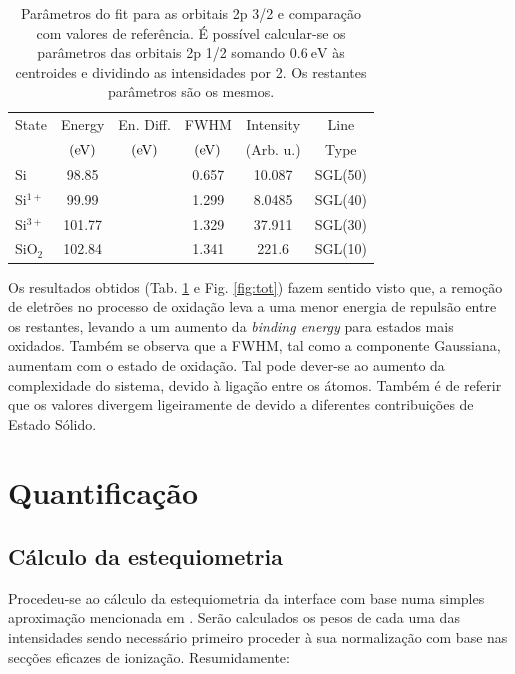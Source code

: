 \documentclass[baaa]{baaa}
\begin{document}
\begin{table}[h!]
  \centering
  \caption{Parâmetros do fit para as orbitais 2p 3/2 e comparação com valores de referência\cite{Nist}. É possível calcular-se os parâmetros das orbitais 2p 1/2 somando $0.6\ \si{\electronvolt}$ às centroides e dividindo as intensidades por 2. Os restantes parâmetros são os mesmos.}
  \begin{tabular}{lccccc}
    \hline\hline\noalign{\smallskip}
    State & Energy &En. Diff.& FWHM& Intensity&Line\\
    & $\qty(\si{\electronvolt})$&$\qty(\si{\electronvolt})$& $\qty(\si{\electronvolt})$& (Arb. u.)&Type\\
    \hline\noalign{\smallskip}
    Si &98.85&& 0.657 &10.087&SGL(50)\\
    Si$^{1+}$&99.99&& 1.299 & 8.0485&SGL(40)\\
    Si$^{3+}$&101.77&&1.329&37.911&SGL(30)\\
    SiO$_2$ & 102.84&&1.341&221.6&SGL(10)\\
    \hline
    \end{tabular}
    \label{table:params}
\end{table}


Os resultados obtidos (Tab. \ref{table:params} e Fig. \ref{fig:tot}) fazem sentido visto que, a remoção de eletrões no processo de oxidação leva a uma menor energia de repulsão entre os restantes, levando a um aumento da \textit{binding energy} para estados mais oxidados. Também se observa que a FWHM, tal como a componente Gaussiana, aumentam com o estado de oxidação. Tal pode dever-se ao aumento da complexidade do sistema, devido à ligação entre os átomos. Também é de referir que os valores divergem ligeiramente de \cite{Himpsel} devido a diferentes contribuições de Estado Sólido.



\section{Quantificação}

\subsection{Cálculo da estequiometria}

Procedeu-se ao cálculo da estequiometria da interface com base numa simples aproximação mencionada em \cite{Himpsel}. Serão calculados os pesos de cada uma das intensidades sendo necessário primeiro proceder à sua normalização com base nas secções eficazes de ionização. Resumidamente:
\end{document}
